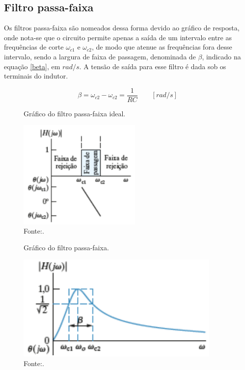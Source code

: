 \subsection{Filtro passa-faixa}

Os filtros passa-faixa são nomeados dessa forma devido ao gráfico de resposta, onde nota-se que o circuito permite apenas a saída de um intervalo entre as frequências de corte $\omega_{c1}$ e $\omega_{c2}$, de modo que atenue as frequências fora desse intervalo, sendo a largura de faixa de passagem, denominada de $\beta$, indicado na equação \ref{beta}, em $rad/s$. A tensão de saída para esse filtro é dada sob os terminais do indutor.

\begin{equation}
	\beta = \omega_{c2} - \omega_{c2} = \frac{1}{RC} \qquad [rad/s]
	\label{beta}
\end{equation}

\begin{figure}[ht]
	\centering
	\caption{Gráfico do filtro passa-faixa ideal.}
	\includegraphics[width=6cm]{images/graficoPassaFaixaIdeal.png}
	\caption*{Fonte:\cite{nilsson2008circuitos}.}
	\label{graficoPassaFaixaIdeal}
\end{figure}

\begin{figure}[ht]
	\centering
	\caption{Gráfico do filtro passa-faixa.}
	\includegraphics[width=10cm]{images/graficoFiltroPassaFaixa.png}
	\caption*{Fonte:\cite{nilsson2008circuitos}.}
\end{figure}

